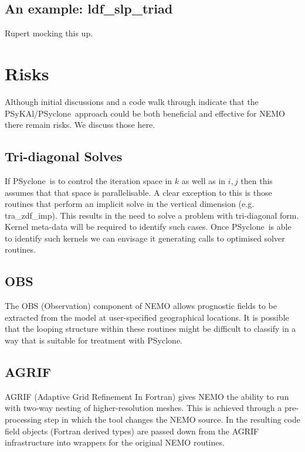 \documentclass{article}
\newcommand{\psykal}{{PS}y{KA}l}
\newcommand{\psyclone}{{PS}yclone}
\begin{document}
\subsection{An example: ldf\_slp\_triad}

Rupert mocking this up.

\section{Risks}

Although initial discussions and a code walk through indicate that the
\psykal/\psyclone\ approach could be both beneficial and effective for
NEMO there remain risks. We discuss those here.

\subsection{Tri-diagonal Solves}

If \psyclone\ is to control the iteration space in $k$ as well as in $i,
j$ then this assumes that that space is parallelisable. A clear
exception to this is those routines that perform an implicit solve in
the vertical dimension (e.g. tra\_zdf\_imp). This results in the need
to solve a problem with tri-diagonal form. Kernel meta-data will be
required to identify such cases. Once \psyclone\ is able to identify
such kernels we can envisage it generating calls to optimised solver
routines.

\subsection{OBS}

The OBS (Observation) component of NEMO allows prognostic fields to be
extracted from the model at user-specified geographical locations.  It
is possible that the looping structure within these routines might be
difficult to classify in a way that is suitable for treatment with
\psyclone.

\subsection{AGRIF}

AGRIF (Adaptive Grid Refinement In Fortran) gives NEMO the ability to
run with two-way nesting of higher-resolution meshes. This is achieved
through a pre-processing step in which the tool changes the NEMO
source. In the resulting code field objects (Fortran derived types)
are passed down from the AGRIF infrastructure into wrappers for the
original NEMO routines.
\end{document}

